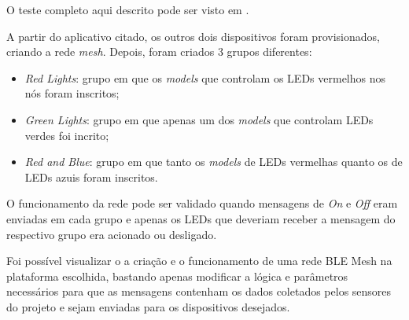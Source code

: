\documentclass[../monografia.tex]{subfiles}
\begin{document}
O teste completo aqui descrito pode ser visto em \cite{teste-ble-mesh}.

A partir do aplicativo citado, os outros dois dispositivos foram provisionados, criando a rede \textit{mesh}. Depois, foram criados 3 grupos diferentes:

\begin{itemize}
	\item \textit{Red Lights}: grupo em que os \textit{models} que controlam os LEDs vermelhos nos nós foram inscritos;
	\item \textit{Green Lights}: grupo em que apenas um dos \textit{models} que controlam LEDs verdes foi incrito;
	\item \textit{Red and Blue}: grupo em que tanto os \textit{models} de LEDs vermelhas quanto os de LEDs azuis foram inscritos.
\end{itemize}

O funcionamento da rede pode ser validado quando mensagens de \textit{On} e \textit{Off} eram enviadas em cada grupo e apenas os LEDs que deveriam receber a mensagem do respectivo grupo era acionado ou desligado.

Foi possível visualizar o a criação e o funcionamento de uma rede BLE Mesh na plataforma escolhida, bastando apenas modificar a lógica e parâmetros necessários para que as mensagens contenham os dados coletados pelos sensores do projeto e sejam enviadas para os dispositivos desejados.
\end{document}
